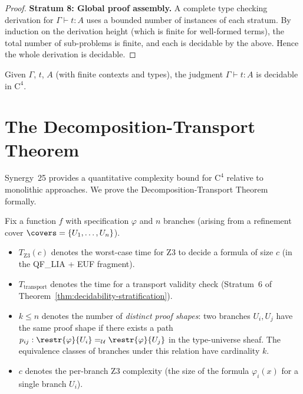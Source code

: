 \begin{proof}
\textbf{Stratum 8: Global proof assembly.}
A complete type checking derivation for $\Gamma \vdash t : A$
uses a bounded number of instances of each stratum.  By induction
on the derivation height (which is finite for well-formed terms),
the total number of sub-problems is finite, and each is decidable
by the above.  Hence the whole derivation is decidable.
\end{proof}

\begin{corollary}
\label{cor:decidability}
Given $\Gamma$, $t$, $A$ (with finite contexts and types), the judgment
$\Gamma \vdash t : A$ is decidable in $\mathrm{C}^4$.
\end{corollary}


\section{The Decomposition-Transport Theorem}
\label{sec:complexity-reduction}

Synergy~25 provides a quantitative complexity bound for $\mathrm{C}^4$
relative to monolithic approaches.  We prove the Decomposition-Transport
Theorem formally.

\begin{definition}
\label{def:complexity-notions}
Fix a function $f$ with specification $\varphi$ and $n$ branches
(arising from a refinement cover $\covers = \{U_1, \ldots, U_n\}$).
\begin{itemize}
\item $T_{\mathrm{Z3}}(c)$ denotes the worst-case time for Z3 to
  decide a formula of size $c$ (in the QF\_LIA + EUF fragment).
\item $T_{\mathrm{transport}}$ denotes the time for a transport
  validity check (Stratum~6 of Theorem~\ref{thm:decidability-stratification}).
\item $k \leq n$ denotes the number of \emph{distinct proof shapes}:
  two branches $U_i, U_j$ have the same proof shape if there exists a
  path $p_{ij} : \restr{\varphi}{U_i} =_\mathcal{U} \restr{\varphi}{U_j}$
  in the type-universe sheaf.  The equivalence classes of branches
  under this relation have cardinality $k$.
\item $c$ denotes the per-branch Z3 complexity (the size of the formula
  $\varphi_i(x)$ for a single branch $U_i$).
\end{itemize}
\end{definition}

